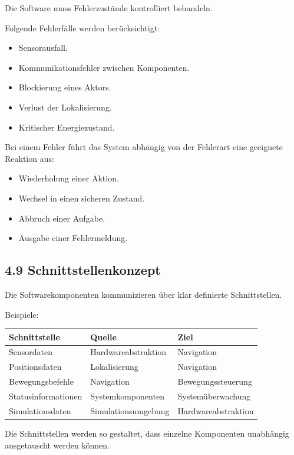 \documentclass[
  a4paper,
  12pt,
  DIV=12,        %
  parskip=half,  %
  headings=small %
]{scrartcl}
\theoremstyle{definition}
\providecommand{\tightlist}{%
  \setlength{\itemsep}{0pt}\setlength{\parskip}{0pt}}
\theoremstyle{definition}
\providecommand{\tightlist}{%
  \setlength{\itemsep}{0pt}\setlength{\parskip}{0pt}}
\begin{document}
Die Software muss Fehlerzustände kontrolliert behandeln.

Folgende Fehlerfälle werden berücksichtigt:

\begin{itemize}
\tightlist
\item
  Sensorausfall.
\item
  Kommunikationsfehler zwischen Komponenten.
\item
  Blockierung eines Aktors.
\item
  Verlust der Lokalisierung.
\item
  Kritischer Energiezustand.
\end{itemize}

Bei einem Fehler führt das System abhängig von der Fehlerart eine
geeignete Reaktion aus:

\begin{itemize}
\tightlist
\item
  Wiederholung einer Aktion.
\item
  Wechsel in einen sicheren Zustand.
\item
  Abbruch einer Aufgabe.
\item
  Ausgabe einer Fehlermeldung.
\end{itemize}

\subsection{4.9 Schnittstellenkonzept}\label{schnittstellenkonzept}

Die Softwarekomponenten kommunizieren über klar definierte
Schnittstellen.

Beispiele:

\begin{longtable}[]{@{}lll@{}}
\toprule\noalign{}
Schnittstelle & Quelle & Ziel \\
\midrule\noalign{}
\endhead
\bottomrule\noalign{}
\endlastfoot
Sensordaten & Hardwareabstraktion & Navigation \\
Positionsdaten & Lokalisierung & Navigation \\
Bewegungsbefehle & Navigation & Bewegungssteuerung \\
Statusinformationen & Systemkomponenten & Systemüberwachung \\
Simulationsdaten & Simulationsumgebung & Hardwareabstraktion \\
\end{longtable}

Die Schnittstellen werden so gestaltet, dass einzelne Komponenten
unabhängig ausgetauscht werden können.
\end{document}
